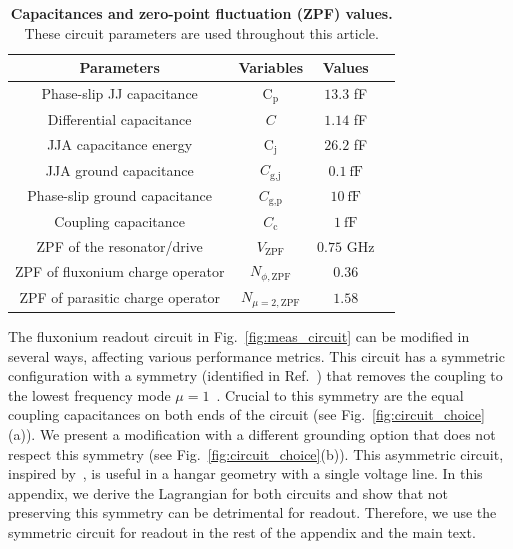 \documentclass[%
reprint,
superscriptaddress,
 amsmath,amssymb,
 aps,
 prx,
longbibliography,
floatfix,
]{revtex4-2}
\begin{document}
\begin{table}[htb]
    \begin{center}
    \begin{tabular}{|c |c| c |c| }
     \hline
     \textbf{Parameters} & \textbf{Variables} & \textbf{Values}\\ 
    \hline
    Phase-slip JJ capacitance &$\textrm{C}_\textrm{p}$ &$13.3$ fF\\ 
    \hline
    Differential capacitance &$C$ &$1.14$ fF\\ 
    \hline
    JJA capacitance energy&$\textrm{C}_\textrm{j}$&$26.2$ fF\\ 
    \hline
    JJA ground capacitance&$C_\textrm{g,j}$&$0.1 \ \mathrm{fF}$\\ 
    \hline
    Phase-slip ground capacitance&$C_\textrm{g,p}$&$10 \ \mathrm{fF}$\\ 
    \hline
    Coupling capacitance&$C_\textrm{c}$ &$1 \ \mathrm{fF}$\\ 
     \hline
      ZPF of the resonator/drive&$V_{\mathrm{ZPF}}$&$0.75$ GHz\\
     \hline
      ZPF of fluxonium charge operator&$N_{\phi,\mathrm{ZPF}}$&$0.36$\\
     \hline
      ZPF of parasitic charge operator&$N_{\mu=2,\mathrm{ZPF}}$&$1.58$\\
     \hline
    \end{tabular}
    \end{center}
    
    \caption{{\bf Capacitances and zero-point fluctuation (ZPF) values.} These circuit parameters are used throughout this article.}
    \label{tab:params}
    \end{table}
The fluxonium readout circuit in Fig.~\ref{fig:meas_circuit} can be modified in several ways, affecting various performance metrics. This circuit has a symmetric configuration with a symmetry (identified in Ref.~\cite{ferguson2013symmetries}) that removes the coupling to the lowest frequency mode $\mu=1$~\cite{viola2015collective}. Crucial to this symmetry are the equal coupling capacitances on both ends of the circuit (see Fig.~\ref{fig:circuit_choice}(a)). We present a modification with a different grounding option that does not respect this symmetry (see Fig.~\ref{fig:circuit_choice}(b)). This asymmetric circuit, inspired by~\cite{zhang_universal_2021}, is useful in a hangar geometry with a single voltage line. In this appendix, we derive the Lagrangian for both circuits and show that not preserving this symmetry can be detrimental for readout. Therefore, we use the symmetric circuit for readout in the rest of the appendix and the main text.
\end{document}
